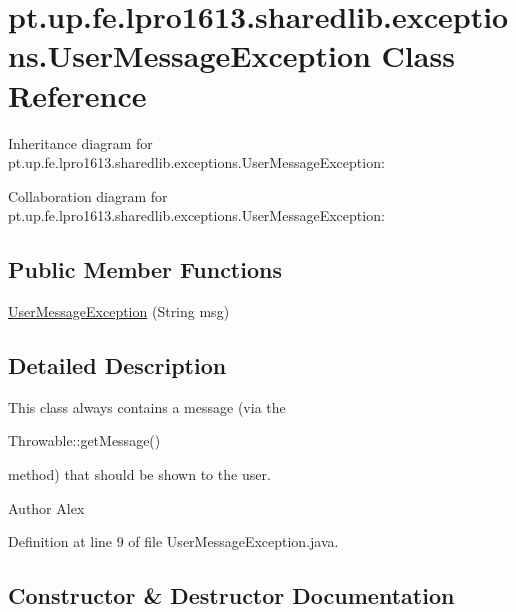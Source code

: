 \hypertarget{classpt_1_1up_1_1fe_1_1lpro1613_1_1sharedlib_1_1exceptions_1_1_user_message_exception}{}\section{pt.\+up.\+fe.\+lpro1613.\+sharedlib.\+exceptions.\+User\+Message\+Exception Class Reference}
\label{classpt_1_1up_1_1fe_1_1lpro1613_1_1sharedlib_1_1exceptions_1_1_user_message_exception}


Inheritance diagram for pt.\+up.\+fe.\+lpro1613.\+sharedlib.\+exceptions.\+User\+Message\+Exception\+:


Collaboration diagram for pt.\+up.\+fe.\+lpro1613.\+sharedlib.\+exceptions.\+User\+Message\+Exception\+:
\subsection*{Public Member Functions}
\begin{DoxyCompactItemize}
\item 
\hyperlink{classpt_1_1up_1_1fe_1_1lpro1613_1_1sharedlib_1_1exceptions_1_1_user_message_exception_a036981d147af9b157ade7a6eb0dfb280}{User\+Message\+Exception} (String msg)
\end{DoxyCompactItemize}


\subsection{Detailed Description}
This class always contains a message (via the
\begin{DoxyCode}
Throwable::getMessage() 
\end{DoxyCode}
 method) that should be shown to the user.

\begin{DoxyAuthor}{Author}
Alex 
\end{DoxyAuthor}


Definition at line 9 of file User\+Message\+Exception.\+java.



\subsection{Constructor \& Destructor Documentation}
\hypertarget{classpt_1_1up_1_1fe_1_1lpro1613_1_1sharedlib_1_1exceptions_1_1_user_message_exception_a036981d147af9b157ade7a6eb0dfb280}{}\label{classpt_1_1up_1_1fe_1_1lpro1613_1_1sharedlib_1_1exceptions_1_1_user_message_exception_a036981d147af9b157ade7a6eb0dfb280} 
